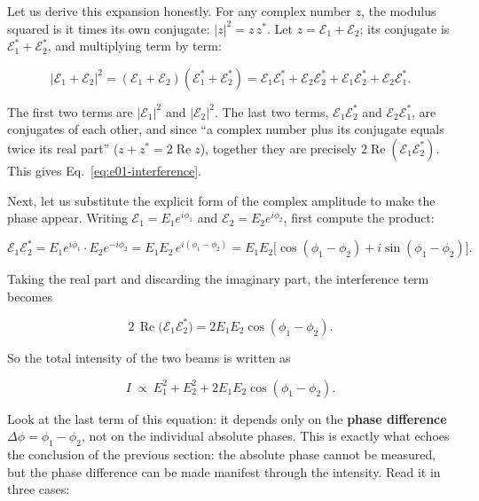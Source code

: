 Let us derive this expansion honestly. For any complex number \(z\), the modulus squared is it times its own conjugate: \(|z|^2=z\,z^{\ast}\). Let \(z=\mathcal E_1+\mathcal E_2\); its conjugate is \(\mathcal E_1^{\ast}+\mathcal E_2^{\ast}\), and multiplying term by term:

\[
  |\mathcal E_1+\mathcal E_2|^2
  =(\mathcal E_1+\mathcal E_2)(\mathcal E_1^{\ast}+\mathcal E_2^{\ast})
  =\mathcal E_1\mathcal E_1^{\ast}+\mathcal E_2\mathcal E_2^{\ast}
  +\mathcal E_1\mathcal E_2^{\ast}+\mathcal E_2\mathcal E_1^{\ast}.
\]

The first two terms are \(|\mathcal E_1|^2\) and \(|\mathcal E_2|^2\). The last two terms, \(\mathcal E_1\mathcal E_2^{\ast}\) and \(\mathcal E_2\mathcal E_1^{\ast}\), are conjugates of each other, and since ``a complex number plus its conjugate equals twice its real part'' (\(z+z^{\ast}=2\operatorname{Re}z\)), together they are precisely \(2\operatorname{Re}(\mathcal E_1\mathcal E_2^{\ast})\). This gives Eq.~\eqref{eq:e01-interference}.

Next, let us substitute the explicit form of the complex amplitude to make the phase appear. Writing \(\mathcal E_1=E_1e^{i\phi_1}\) and \(\mathcal E_2=E_2e^{i\phi_2}\), first compute the product:

\[
  \mathcal E_1\mathcal E_2^{\ast}
  =E_1e^{i\phi_1}\cdot E_2e^{-i\phi_2}
  =E_1E_2\,e^{i(\phi_1-\phi_2)}
  =E_1E_2\bigl[\cos(\phi_1-\phi_2)+i\sin(\phi_1-\phi_2)\bigr].
\]

Taking the real part and discarding the imaginary part, the interference term becomes

\[
  2\,\operatorname{Re}\!\bigl(\mathcal E_1\mathcal E_2^{\ast}\bigr)
  =2E_1E_2\cos(\phi_1-\phi_2).
\]

So the total intensity of the two beams is written as

\[
  I\ \propto\ E_1^2+E_2^2+2E_1E_2\cos(\phi_1-\phi_2).
\]

Look at the last term of this equation: it depends only on the \textbf{phase difference} \(\Delta\phi=\phi_1-\phi_2\), not on the individual absolute phases. This is exactly what echoes the conclusion of the previous section: the absolute phase cannot be measured, but the phase difference can be made manifest through the intensity. Read it in three cases:


